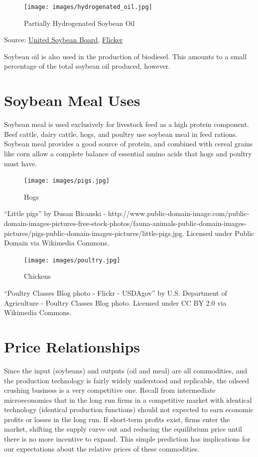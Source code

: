 \documentclass[
]{book}
\begin{document}
\begin{figure}
\centering
\texttt{[image: images/hydrogenated\_oil.jpg]}
\caption{Partially Hydrogenated Soybean Oil}
\end{figure}

Source: \href{http://unitedsoybean.org/}{United Soybean Board}, \href{https://www.flickr.com/photos/unitedsoybean/16910795086/}{Flicker}

Soybean oil is also used in the production of biodiesel. This amounts to a small percentage of the total soybean oil produced, however.

\hypertarget{soybean-meal-uses}{%
\section{Soybean Meal Uses}\label{soybean-meal-uses}}

Soybean meal is used exclusively for livestock feed as a high protein component. Beef cattle, dairy cattle, hogs, and poultry use soybean meal in feed rations. Soybean meal provides a good source of protein, and combined with cereal grains like corn allow a complete balance of essential amino acids that hogs and poultry must have.

\begin{figure}
\centering
\texttt{[image: images/pigs.jpg]}
\caption{Hogs}
\end{figure}

``Little pigs'' by Dusan Bicanski - http://www.public-domain-image.com/public-domain-images-pictures-free-stock-photos/fauna-animals-public-domain-images-pictures/pigs-public-domain-images-pictures/little-pigs.jpg. Licensed under Public Domain via Wikimedia Commons.

\begin{figure}
\centering
\texttt{[image: images/poultry.jpg]}
\caption{Chickens}
\end{figure}

``Poultry Classes Blog photo - Flickr - USDAgov'' by U.S. Department of Agriculture - Poultry Classes Blog photo. Licensed under CC BY 2.0 via Wikimedia Commons.

\hypertarget{price-relationships}{%
\section{Price Relationships}\label{price-relationships}}

Since the input (soybeans) and outputs (oil and meal) are all commodities, and the production technology is fairly widely understood and replicable, the oilseed crushing business is a very competitive one. Recall from intermediate microeconomics that in the long run firms in a competitive market with identical technology (identical production functions) should not expected to earn economic profits or losses in the long run. If short-term profits exist, firms enter the market, shifting the supply curve out and reducing the equilibrium price until there is no more incentive to expand. This simple prediction has implications for our expectations about the relative prices of these commodities.
\end{document}
